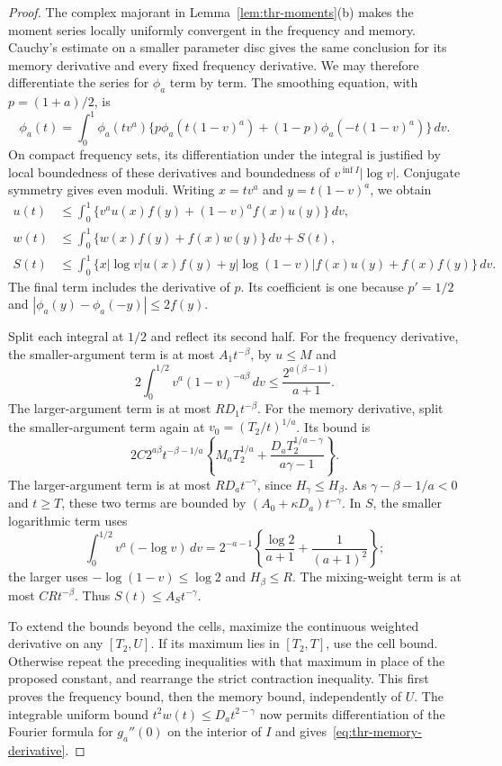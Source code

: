\begin{proof}
The complex majorant in Lemma~\ref{lem:thr-moments}(b) makes the
moment series locally uniformly convergent in the frequency and memory.
Cauchy's estimate on a smaller parameter disc gives the same conclusion
for its memory derivative and every fixed frequency derivative.
We may therefore differentiate the series for $\phi_a$ term by term.
The smoothing equation, with $p=(1+a)/2$, is
\[
 \phi_a(t)=\int_0^1\phi_a(tv^a)
 \{p\phi_a(t(1-v)^a)+(1-p)\phi_a(-t(1-v)^a)\}\,dv.
\]
On compact frequency sets, its differentiation under the integral is
justified by local boundedness of these derivatives and boundedness of
$v^{\inf I}|\log v|$. Conjugate symmetry gives even moduli.
Writing $x=tv^a$ and $y=t(1-v)^a$, we obtain
\begin{align*}
 u(t)&\le\int_0^1\{v^au(x)f(y)+(1-v)^af(x)u(y)\}\,dv,\\
 w(t)&\le\int_0^1\{w(x)f(y)+f(x)w(y)\}\,dv+S(t),\\
 S(t)&\le\int_0^1\{x|\log v|u(x)f(y)
             +y|\log(1-v)|f(x)u(y)+f(x)f(y)\}\,dv.
\end{align*}
The final term includes the derivative of $p$. Its coefficient is one because $p'=1/2$ and $|\phi_a(y)-\phi_a(-y)|\le2f(y)$.

Split each integral at $1/2$ and reflect its second half. For the
frequency derivative, the smaller-argument term is at most
$A_1t^{-\beta}$, by $u\le M$ and
\[
 2\int_0^{1/2}v^a(1-v)^{-a\beta}\,dv
 \le\frac{2^{a(\beta-1)}}{a+1}.
\]
The larger-argument term is at most $RD_1t^{-\beta}$.
For the memory derivative, split the smaller-argument term again at
$v_0=(T_2/t)^{1/a}$. Its bound is
\[
 2C2^{a\beta}t^{-\beta-1/a}
 \left\{M_aT_2^{1/a}+
 \frac{D_aT_2^{1/a-\gamma}}{a\gamma-1}\right\}.
\]
The larger-argument term is at most $RD_at^{-\gamma}$, since
$H_\gamma\le H_\beta$. As $\gamma-\beta-1/a<0$ and $t\ge T$,
these two terms are bounded by $(A_0+\kappa D_a)t^{-\gamma}$.
In $S$, the smaller logarithmic term uses
\[
 \int_0^{1/2}v^a(-\log v)\,dv
 =2^{-a-1}\left\{\frac{\log2}{a+1}+\frac1{(a+1)^2}\right\};
\]
the larger uses $-\log(1-v)\le\log2$ and $H_\beta\le R$.
The mixing-weight term is at most $CRt^{-\beta}$.
Thus $S(t)\le A_St^{-\gamma}$.

To extend the bounds beyond the cells, maximize the continuous weighted derivative on any $[T_2,U]$.
If its maximum lies in $[T_2,T]$, use the cell bound. Otherwise repeat
the preceding inequalities with that maximum in place of the proposed
constant, and rearrange the strict contraction inequality. This first
proves the frequency bound, then the memory bound, independently of $U$.
The integrable uniform bound $t^2w(t)\le D_at^{2-\gamma}$ now permits
differentiation of the Fourier formula for $g_a''(0)$ on the interior
of $I$ and gives~\eqref{eq:thr-memory-derivative}.
\end{proof}


